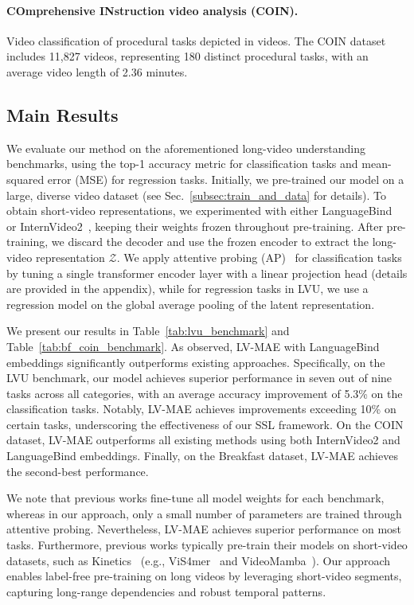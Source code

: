 \paragraph{COmprehensive INstruction video analysis (COIN).}
Video classification of procedural tasks depicted in videos.
The COIN dataset~\cite{tang2019coin} includes 11,827 videos, representing 180 distinct procedural tasks, with an average video length of 2.36 minutes.


\subsection{Main Results}
We evaluate our method on the aforementioned long-video understanding benchmarks, using the top-1 accuracy metric for classification tasks and mean-squared error (MSE) for regression tasks. Initially, we pre-trained our model on a large, diverse video dataset (see Sec.~\ref{subsec:train_and_data} for details). 
To obtain short-video representations, we experimented with either LanguageBind~\cite{zhu2024languagebind} or InternVideo2~\cite{Wang2024InternVideo2SV}, keeping their weights frozen throughout pre-training.
After pre-training, we discard the decoder and use the frozen encoder to extract the long-video representation $\mathcal{Z}$. 
We apply attentive probing (AP)~\cite{yu2022coca, lee2019set} for classification tasks by tuning a single transformer encoder layer with a linear projection head
(details are provided in the appendix), while for regression tasks in LVU, we use a regression model on the global average pooling of the latent representation.




We present our results in Table~\ref{tab:lvu_benchmark} and Table~\ref{tab:bf_coin_benchmark}.
As observed, LV-MAE with LanguageBind embeddings significantly outperforms existing approaches.
Specifically, on the LVU benchmark, our model achieves superior performance in seven out of nine tasks across all categories, with an average accuracy improvement of 5.3\% on the classification tasks. Notably, LV-MAE achieves improvements exceeding 10\% on certain tasks, underscoring the effectiveness of our SSL framework.
On the COIN dataset, LV-MAE outperforms all existing methods using both InternVideo2 and LanguageBind embeddings. 
Finally, on the Breakfast dataset, LV-MAE achieves the second-best performance.

We note that previous works fine-tune all model weights for each benchmark, whereas in our approach, only a small number of parameters are trained through attentive probing. Nevertheless, LV-MAE achieves superior performance on most tasks.
Furthermore, previous works typically pre-train their models on short-video datasets, such as Kinetics~\cite{Kay2017TheKH} (e.g., ViS4mer~\cite{islam2022long} and VideoMamba~\cite{li2024videomamba}). Our approach enables label-free pre-training on long videos by leveraging short-video segments, capturing long-range dependencies and robust temporal patterns.

